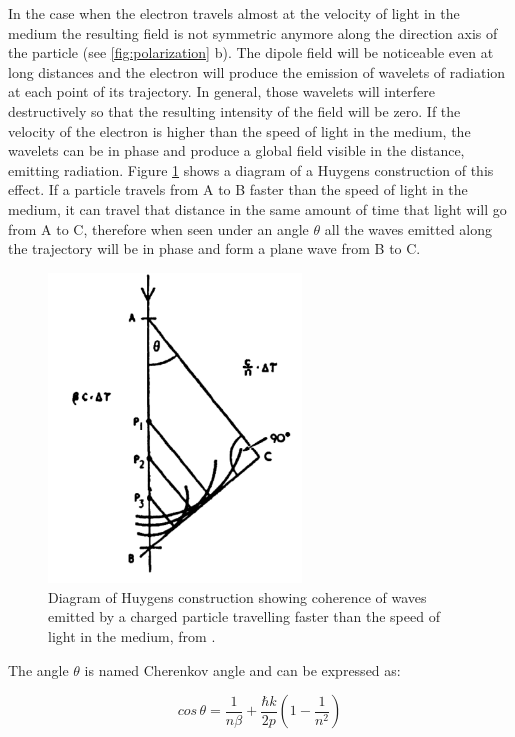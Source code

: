 \documentclass[main.tex]{subfiles}
\begin{document}
In the case when the electron travels almost at the velocity of light in the medium the resulting field is not symmetric anymore along the direction axis of the particle (see \ref{fig:polarization} b). The dipole field will be noticeable even at long distances and the electron will produce the emission of wavelets of radiation at each point of its trajectory. In general, those wavelets will interfere destructively so that the resulting intensity of the field will be zero. If the velocity of the electron is higher than the speed of light in the medium, the wavelets can be in phase and produce a global field visible in the distance, emitting radiation. Figure \ref{fig:huygens} shows a diagram of a Huygens construction of this effect. If a particle travels from A to B faster than the speed of light in the medium, it can travel that distance in the same amount of time that light will go from A to C, therefore when seen under an angle $\theta$ all the waves emitted along the trajectory will be in phase and form a plane wave from B to C.

\begin{figure}[h]
  \centering
  \includegraphics[width=0.6\textwidth]{Pictures/huygenscoherence.pdf}
  \caption{Diagram of Huygens construction showing coherence of waves emitted by a charged particle travelling faster than the speed of light in the medium, from \cite{jelley1958Cherenkov}.}
  \label{fig:huygens}
\end{figure}

The angle $\theta$ is named Cherenkov angle and can be expressed as:

\begin{equation}
  cos\,\theta = \frac{1}{n\beta} + \frac{\hbar k}{2p} \left( 1-\frac{1}{n^2}\right)
\end{equation}
\end{document}
